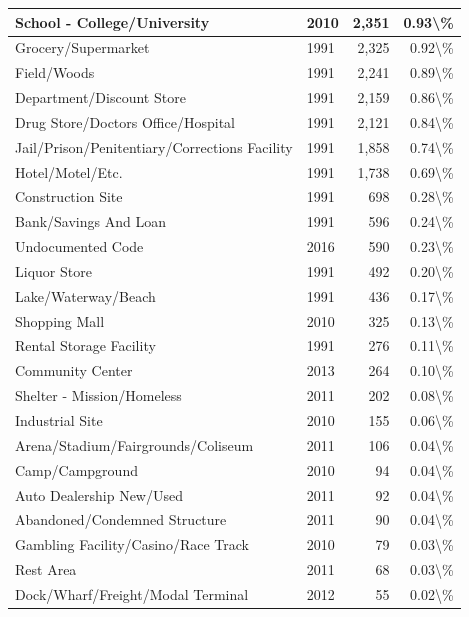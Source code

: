 \documentclass[
]{krantz}
\begin{document}
\begin{longtable}[t]{l|l|r|r}
\hline
School - College/University & 2010 & 2,351 & 0.93\textbackslash{}\%\\
\hline
Grocery/Supermarket & 1991 & 2,325 & 0.92\textbackslash{}\%\\
\hline
Field/Woods & 1991 & 2,241 & 0.89\textbackslash{}\%\\
\hline
Department/Discount Store & 1991 & 2,159 & 0.86\textbackslash{}\%\\
\hline
Drug Store/Doctors Office/Hospital & 1991 & 2,121 & 0.84\textbackslash{}\%\\
\hline
Jail/Prison/Penitentiary/Corrections Facility & 1991 & 1,858 & 0.74\textbackslash{}\%\\
\hline
Hotel/Motel/Etc. & 1991 & 1,738 & 0.69\textbackslash{}\%\\
\hline
Construction Site & 1991 & 698 & 0.28\textbackslash{}\%\\
\hline
Bank/Savings And Loan & 1991 & 596 & 0.24\textbackslash{}\%\\
\hline
Undocumented Code & 2016 & 590 & 0.23\textbackslash{}\%\\
\hline
Liquor Store & 1991 & 492 & 0.20\textbackslash{}\%\\
\hline
Lake/Waterway/Beach & 1991 & 436 & 0.17\textbackslash{}\%\\
\hline
Shopping Mall & 2010 & 325 & 0.13\textbackslash{}\%\\
\hline
Rental Storage Facility & 1991 & 276 & 0.11\textbackslash{}\%\\
\hline
Community Center & 2013 & 264 & 0.10\textbackslash{}\%\\
\hline
Shelter - Mission/Homeless & 2011 & 202 & 0.08\textbackslash{}\%\\
\hline
Industrial Site & 2010 & 155 & 0.06\textbackslash{}\%\\
\hline
Arena/Stadium/Fairgrounds/Coliseum & 2011 & 106 & 0.04\textbackslash{}\%\\
\hline
Camp/Campground & 2010 & 94 & 0.04\textbackslash{}\%\\
\hline
Auto Dealership New/Used & 2011 & 92 & 0.04\textbackslash{}\%\\
\hline
Abandoned/Condemned Structure & 2011 & 90 & 0.04\textbackslash{}\%\\
\hline
Gambling Facility/Casino/Race Track & 2010 & 79 & 0.03\textbackslash{}\%\\
\hline
Rest Area & 2011 & 68 & 0.03\textbackslash{}\%\\
\hline
Dock/Wharf/Freight/Modal Terminal & 2012 & 55 & 0.02\textbackslash{}\%\\

\end{longtable}
\end{document}
